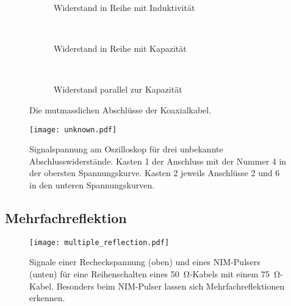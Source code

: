 \begin{figure}
    \centering
    \begin{subfigure}[b]{0.3\textwidth}
        
        \caption{Widerstand in Reihe mit Induktivität}
        \label{fig:end_1}
    \end{subfigure}
    ~ %
    \begin{subfigure}[b]{0.3\textwidth}
        
        \caption{Widerstand in Reihe mit Kapazität}
        \label{fig:end_2}
    \end{subfigure}
    ~ %
    \begin{subfigure}[b]{0.3\textwidth}
        
        \caption{Widerstand parallel zur Kapazität}
        \label{fig:end_3}
    \end{subfigure}
    \caption{Die mutmasslichen Abschlüsse der Koaxialkabel.}\label{fig:ends}
\end{figure}

\begin{figure}
  \centering
  \texttt{[image: unknown.pdf]}
  \caption{%
    Signalspannung am Oszilloskop für drei unbekannte Abschlusswiderstände.
    Kasten 1 der Anschluss mit der Nummer 4 in der obersten Spannungskurve. Kasten 2 jeweils Anschlüsse 2 und 6 in den
    unteren Spannungskurven.
  }\label{fig:unknown}
\end{figure}

\subsection{Mehrfachreflektion}

\begin{figure}
  \centering
  \texttt{[image: multiple\_reflection.pdf]}
  \caption{%
    Signale einer Recheckspannung (oben) und eines NIM-Pulsers (unten) für eine Reihenschalten eines \SI{50}{\ohm}-Kabels mit einem \SI{75}{\ohm}-Kabel.
    Besonders beim NIM-Pulser lassen sich Mehrfachreflektionen erkennen.
  }\label{fig:multiple_reflection}
\end{figure}

